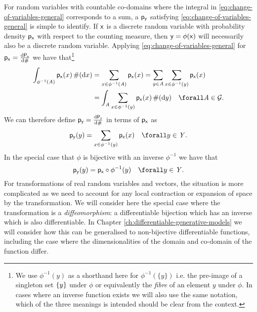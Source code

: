 For random variables with countable co-domains where the integral in \eqref{eq:change-of-variables-general} corresponds to a sum, a $\mathsf{p}_{\mathsf{y}}$ satisfying \eqref{eq:change-of-variables-general} is simple to identify. If $\mathsf{x}$ is a discrete random variable with probability density $\mathsf{p}_{\mathsf{x}}$ with respect to the counting measure, then $\mathsf{y} = \phi(\mathsf{x})$ will necessarily also be a discrete random variable. Applying \eqref{eq:change-of-variables-general} for $\mathsf{p}_{\mathsf{x}} = \frac{\mathrm{d} \mathsf{P}_{\mathsf{x}}}{\mathrm{d} \#}$ we have that\footnote{We use $\phi^{-1}(y)$ as a shorthand here for $\phi^{-1}(\lbrace y \rbrace)$ i.e. the pre-image of a singleton set $\fset{y}$ under $\phi$ or equivalently the \emph{fibre} of an element $y$ under $\phi$. In cases where an inverse function exists we will also use the same notation, which of the three meanings is intended should be clear from the context.} 
\begin{align}\label{eq:change-of-variables-discrete-derivation}
  \int_{\phi^{-1}(\set{A})} \pden{\rvar{x}}(x) \,\countm(\dr x) &= 
  \sum_{x\in\phi^{-1}(\set{A})} \pden{\rvar{x}}(x)  =
  \sum_{y \in \set{A}} \sum_{x\in\phi^{-1}(y)} \pden{\rvar{x}}(x) \nonumber \\
  &= \int_{\set{A}} \sum_{x\in\phi^{-1}(y)} \pden{\rvar{x}}(x) \,\countm(\dr y)
  \quad \forall \set{A} \in \sset{G}.
\end{align}
We can therefore define $\mathsf{p}_{\mathsf{y}} = \frac{\mathrm{d} \mathsf{P}_{\mathsf{y}}}{\mathrm{d} \#}$ in terms of $\mathsf{p}_{\mathsf{x}}$ as
\begin{equation}\label{eq:change-of-variables-discrete}
  \pden{\rvar{y}}(y) = \sum_{x \in \phi^{-1}(y)} \pden{\rvar{x}}(x)
  \quad \forall y \in \set{Y}.
\end{equation}
In the special case that $\phi$ is bijective with an inverse $\phi^{-1}$ we have that 
\begin{equation}\label{eq:change-of-variables-discrete-bijective}
  \pden{\rvar{y}}(y) = \pden{\rvar{x}}\circ\phi^{-1}(y)
  \quad \forall y \in \set{Y}.
\end{equation}
For transformations of real random variables and vectors, the situation is more complicated as we need to account for any local contraction or expansion of space by the transformation. We will consider here the special case where the transformation is a \emph{diffeomorphism}: a differentiable bijection which has an inverse which is also differentiable. In Chapter \ref{ch:differentiable-generative-models} we will consider how this can be generalised to non-bijective differentiable functions, including the case where the dimensionalities of the domain and co-domain of the function differ.

